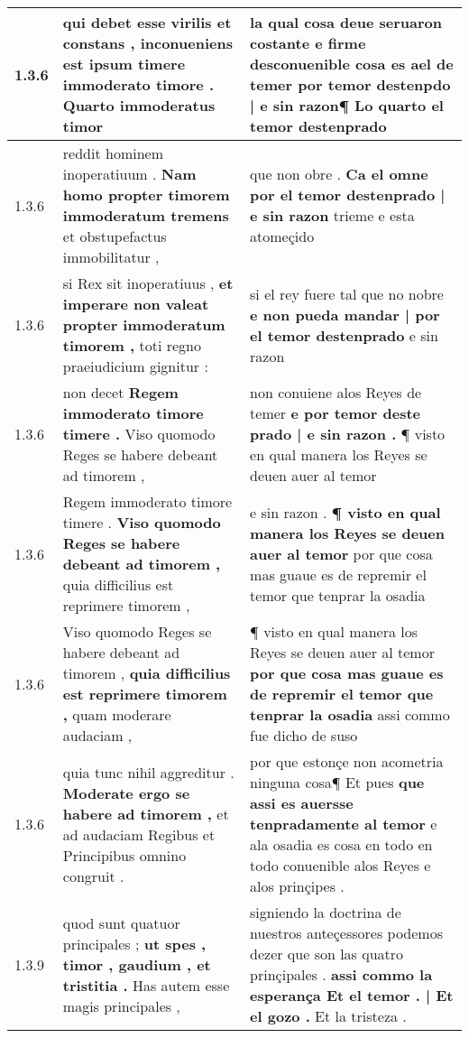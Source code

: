 \begin{tabular}{|p{1cm}|p{6.5cm}|p{6.5cm}|}
1.3.6 & qui debet esse virilis et constans , \textbf{ inconueniens est ipsum timere immoderato timore . } Quarto immoderatus timor & la qual cosa deue seruaron costante e firme desconuenible cosa es ael de temer \textbf{ por temor destenpdo | e sin razon¶ } Lo quarto el temor destenprado \\\hline
1.3.6 & reddit hominem inoperatiuum . \textbf{ Nam homo propter timorem immoderatum tremens } et obstupefactus immobilitatur , & que non obre . \textbf{ Ca el omne por el temor destenprado | e sin razon } trieme e esta atomeçido \\\hline
1.3.6 & si Rex sit inoperatiuus , \textbf{ et imperare non valeat propter immoderatum timorem , } toti regno praeiudicium gignitur : & si el rey fuere tal que no nobre \textbf{ e non pueda mandar | por el temor destenprado } e sin razon \\\hline
1.3.6 & non decet \textbf{ Regem immoderato timore timere . } Viso quomodo Reges se habere debeant ad timorem , & non conuiene alos Reyes de temer \textbf{ e por temor deste prado | e sin razon . } ¶ visto en qual manera los Reyes se deuen auer al temor \\\hline
1.3.6 & Regem immoderato timore timere . \textbf{ Viso quomodo Reges se habere debeant ad timorem , } quia difficilius est reprimere timorem , & e sin razon . \textbf{ ¶ visto en qual manera los Reyes se deuen auer al temor } por que cosa mas guaue es de repremir el temor que tenprar la osadia \\\hline
1.3.6 & Viso quomodo Reges se habere debeant ad timorem , \textbf{ quia difficilius est reprimere timorem , } quam moderare audaciam , & ¶ visto en qual manera los Reyes se deuen auer al temor \textbf{ por que cosa mas guaue es de repremir el temor que tenprar la osadia } assi commo fue dicho de suso \\\hline
1.3.6 & quia tunc nihil aggreditur . \textbf{ Moderate ergo se habere ad timorem , } et ad audaciam Regibus et Principibus omnino congruit . & por que estonçe non acometria ninguna cosa¶ Et pues \textbf{ que assi es auersse tenpradamente al temor } e ala osadia es cosa en todo en todo conuenible alos Reyes e alos prinçipes . \\\hline
1.3.9 & quod sunt quatuor principales ; \textbf{ ut spes , timor , gaudium , et tristitia . } Has autem esse magis principales , & signiendo la doctrina de nuestros anteçessores podemos dezer que son las quatro prinçipales . \textbf{ assi commo la esperança Et el temor . | Et el gozo . } Et la tristeza . \\\hline

\end{tabular}
